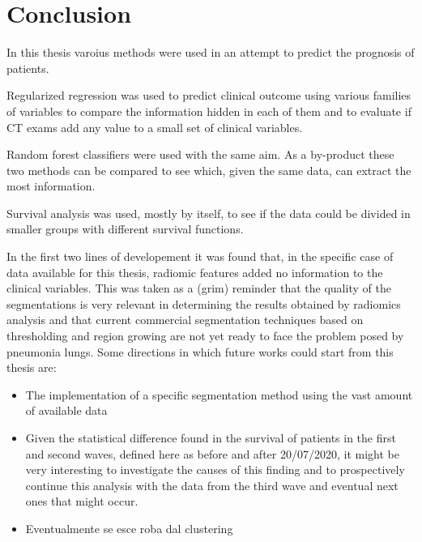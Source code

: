 \chapter{Conclusion}

In this thesis varoius methods were used in an attempt to predict the prognosis of \covid patients. 

Regularized regression was used to predict clinical outcome using various families of variables to compare the information hidden in each of them and to evaluate if CT exams add any value to a small set of clinical variables.

Random forest classifiers were used with the same aim. As a by-product these two methods can be compared to see which, given the same data, can extract the most information.

Survival analysis was used, mostly by itself, to see if the data could be divided in smaller groups with different survival functions.

In the first two lines of developement it was found that, in the specific case of data available for this thesis, radiomic features added no information to the clinical variables.
This was taken as a (grim) reminder that the quality of the segmentations is very relevant in determining the results obtained by radiomics analysis and that current commercial segmentation techniques based on thresholding and region growing are not yet ready to face the problem posed by \covid pneumonia lungs.
Some directions in which future works could start from this thesis are:

\begin{itemize}
\item The implementation of a \covid specific segmentation method using the vast amount of available data
\item Given the statistical difference found in the survival of patients in the first and second waves, defined here as before and after 20/07/2020, it might be very interesting to investigate the causes of this finding and to prospectively continue this analysis with the data from the third wave and eventual next ones that might occur.
\item Eventualmente se esce roba dal clustering
\end{itemize}